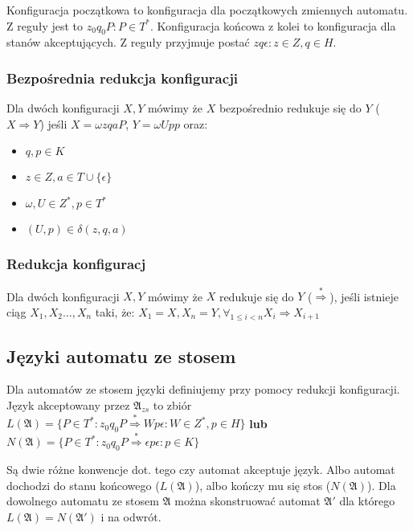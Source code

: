 \documentclass{../notatki}
\begin{document}
Konfiguracja początkowa to konfiguracja dla początkowych zmiennych automatu.
Z reguły jest to $z_0q_0P : P \in T^*$. Konfiguracja końcowa z kolei to
konfiguracja dla stanów akceptujących. Z reguły przyjmuje postać $z
q\epsilon : z \in Z, q \in H$.

\subsubsection{Bezpośrednia redukcja konfiguracji}

Dla dwóch konfiguracji $X, Y$ mówimy że $X$ bezpośrednio redukuje się do $Y$
($X \Rightarrow Y$) jeśli $X=\omega zqaP$, $Y=\omega Upp$ oraz:

\begin{itemize}
  \item $q,p \in K$
  \item $z \in Z, a \in T \cup \{\epsilon\}$
  \item $\omega, U \in Z^*, p \in T^*$
  \item $(U, p) \in \delta(z, q, a)$
\end{itemize}

\subsubsection{Redukcja konfiguracj}

Dla dwóch konfiguracji $X, Y$ mówimy że $X$ redukuje się do $Y$
($\stackrel{*}{\Rightarrow}$), jeśli istnieje ciąg $X_1,X_2\dots, X_n$ taki, że:
$X_1 = X, X_n = Y, \forall_{1 \le i < n}X_i \Rightarrow X_{i + 1}$

\subsection{Języki automatu ze stosem}

Dla automatów ze stosem języki definiujemy przy pomocy redukcji konfiguracji.
Język akceptowany przez $\mathfrak{A}_{zs}$ to zbiór
$L(\mathfrak{A})=\{P \in T^* : z_0q_0P \stackrel{*}{\Rightarrow}
Wp\epsilon : W \in Z^*, p \in H\}$
\textbf{lub} $N(\mathfrak{A})=\{P \in T^* : z_0q_0P
\stackrel{*}{\Rightarrow} \epsilon p \epsilon : p \in K\}$

Są dwie różne konwencje dot. tego czy automat akceptuje język. Albo automat
dochodzi do stanu końcowego ($L(\mathfrak{A})$), albo kończy mu się
stos ($N(\mathfrak{A})$). Dla dowolnego automatu ze stosem $\mathfrak{A}$ można
skonstruować automat $\mathfrak{A}'$ dla którego
$L(\mathfrak{A})=N(\mathfrak{A}')$ i na odwrót.
\end{document}
